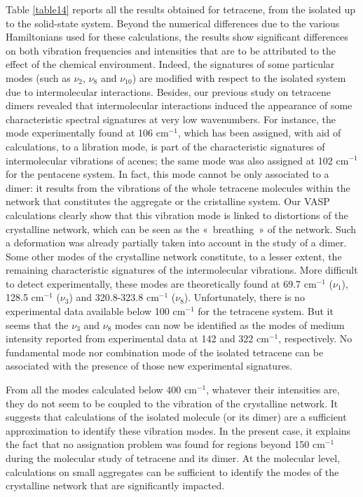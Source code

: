  Table \ref{table14} reports all the results obtained for tetracene, from the isolated up to the solid-state system. Beyond the numerical differences due to the various Hamiltonians used for these calculations, the results show significant differences on both vibration frequencies and intensities that are to be attributed to the effect of the chemical environment. Indeed, the signatures of some particular modes (such as $\nu_{2}$, $\nu_{8}$ and $\nu_{10}$) are modified with respect to the isolated system due to intermolecular interactions. Besides, our previous study on tetracene dimers revealed that intermolecular interactions induced the appearance of some characteristic spectral signatures at very low wavenumbers. For instance, the mode experimentally found at 106 cm$^{-1}$, which has been assigned, with aid of calculations, to a libration mode, is part of the characteristic signatures of intermolecular vibrations of acenes; the same mode was also assigned at 102 cm$^{-1}$ for the pentacene system. In fact, this mode cannot be only associated to a dimer: it results from the vibrations of the whole tetracene molecules within the network that constitutes the aggregate or the cristalline system. Our VASP calculations clearly show that this vibration mode is linked to distortions of the  crystalline network, which can be seen as the « breathing » of the network. Such a deformation was already partially taken into account in the study of a dimer. Some other modes of the crystalline network constitute, to a lesser extent, the remaining characteristic signatures of the intermolecular vibrations. More difficult to detect experimentally, these modes are theoretically found at 69.7 cm$^{-1}$ ($\nu_{1}$), 128.5 cm$^{-1}$ ($\nu_{3}$) and 320.8-323.8 cm$^{-1}$ ($\nu_{8}$). Unfortunately, there is no experimental data available below 100 cm$^{-1}$ for the tetracene system. But it seems that the $\nu_{3}$ and $\nu_{8}$ modes can now be identified as the modes of medium intensity reported from experimental data at 142 and 322 cm$^{-1}$, respectively. No fundamental mode nor combination mode of the isolated tetracene can be associated with the presence of those new experimental signatures.
 
 From all the modes calculated below 400 cm$^{-1}$, whatever their intensities are, they do not seem to be coupled to the vibration of the crystalline network. It suggests that calculations of the isolated molecule (or its dimer) are a sufficient approximation to identify these vibration modes. In the present case, it explains the fact that no assignation problem was found for regions beyond 150 cm$^{-1}$ during the molecular study of tetracene and its dimer. At the molecular level, calculations on small aggregates can be sufficient to identify the modes of the crystalline network that are significantly impacted.


